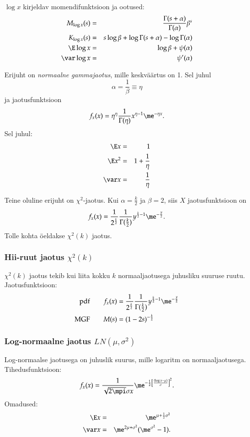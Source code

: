 \documentclass[a4paper]{article}
\numberwithin{equation}{subsection}
\begin{document}
$\log x$ kirjeldav momendifunktsioon ja ootused:
\begin{eqnarray}
M_{\log x} (s) &=& \frac{\Gamma(s + \alpha)}{\Gamma(\alpha)}\beta^s\\
K_{\log x} (s) &=& s\log \beta + \log \Gamma(s + \alpha) -
  \log\Gamma(\alpha)\\
\E\log x &=& \log\beta + \psi(\alpha)\\
\var\log x &=& \psi'(\alpha)
\end{eqnarray}

Erijuht on \emph{normaalne gammajaotus}, mille keskväärtus on 1.  Sel
juhul 
\begin{equation}
\alpha = \frac{1}{\beta} \equiv \eta
\end{equation}
ja jaotusfunktsioon
\begin{equation}
f_x(x) = \eta^\eta \frac{1}{\Gamma(\eta)} x^{\eta - 1} \me^{-\eta x}.
\end{equation}
Sel juhul:
\begin{eqnarray}
  \E x &=& 1\\
  \E x^2 &=& 1 + \frac{1}{\eta}\\
  \var x &=& \frac{1}{\eta}
\end{eqnarray}

Teine oluline erijuht on $\chi^2$-jaotus.  Kui $\alpha=\frac{k}{2}$ ja
$\beta=2$, siis $X$ jaotusfunktsioon on
\begin{equation}
f_x (x) = \frac{1}{2^\frac{k}{2}} \frac{1}{\Gamma(\frac{k}{2})}
  y^{\frac{k}{2} - 1} \me^{-\frac{y}{2}}.
\end{equation}
Tolle kohta öeldakse $\chi^2(k)$ jaotus.


\subsubsection{Hii-ruut jaotus $\chi^2(k)$}
$\chi^2 (k)$ jaotus tekib kui liita kokku $k$ normaaljaotusega
juhusliku suuruse ruutu.  Jaotusfunktsioon:
\begin{align}
\text{pdf}
\qquad &
f_x (x) = \frac{1}{2^\frac{k}{2}} \frac{1}{\Gamma(\frac{k}{2})}
  y^{\frac{k}{2} - 1} \me^{-\frac{y}{2}}
\\
\text{MGF}
\qquad &
M(s) = (1 - 2s)^{-\frac{k}{2}}
\end{align}


\subsubsection{Log-normaalne jaotus $LN(\mu,\sigma^2)$}
Log-normaalse jaotusega on juhuslik suurus, mille logaritm on
normaaljaotusega.  Tihedusfunktsioon:
\begin{equation}
f_x (x) = \frac{1}{\sqrt{2\mpi}\sigma x}
  \me^{-\frac{1}{2}\left[\frac{(\log x - \mu)}{\sigma}\right]^2}.
\end{equation}
Omadused:
\begin{eqnarray}
\E x &=& \me^{\mu + \frac{1}{2}\sigma^2}\\
\var x &=& \me^{2\mu + \sigma^2} (\me^{\sigma^2} - 1).
\end{eqnarray}
\end{document}
